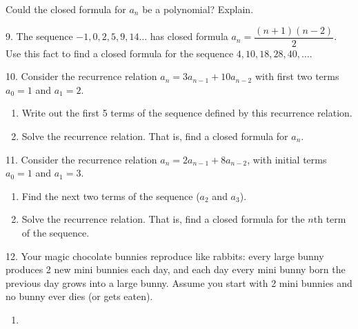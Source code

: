 \documentclass[10pt,]{book}
\theoremstyle{plain}
\theoremstyle{definition}
\theoremstyle{definition}
\theoremstyle{definition}
\numberwithin{equation}{chapter}
\begin{document}
\begin{exerciselist}
\begin{enumerate}[label=(\alph*)]
                Could the closed formula for \(a_n\) be a polynomial? Explain.
\end{enumerate}
\par\smallskip
\item[9.]\hypertarget{exercise-196}{}
            The sequence \(-1, 0, 2, 5, 9, 14\ldots\) has closed formula \(a_n = \dfrac{(n+1)(n-2)}{2}\). Use this fact to find a closed formula for the sequence \(4, 10, 18, 28, 40, \ldots\).
\par\smallskip
\item[10.]\hypertarget{exercise-197}{}
            Consider the recurrence relation \(a_n = 3a_{n-1} + 10 a_{n-2}\) with first two terms \(a_0 = 1\) and \(a_1 = 2\).
\leavevmode%
\begin{enumerate}[label=(\alph*)]
\item\hypertarget{li-989}{}
                Write out the first 5 terms of the sequence defined by this recurrence relation.
\item\hypertarget{li-990}{}
                Solve the recurrence relation. That is, find a closed formula for \(a_n\).
\end{enumerate}
\par\smallskip
\item[11.]\hypertarget{exercise-198}{}
            Consider the recurrence relation \(a_n = 2a_{n-1} + 8a_{n-2}\), with initial terms \(a_0 = 1\) and \(a_1= 3\).
\leavevmode%
\begin{enumerate}[label=(\alph*)]
\item\hypertarget{li-993}{}
                Find the next two terms of the sequence (\(a_2\) and \(a_3\)).
\item\hypertarget{li-994}{}
                Solve the recurrence relation. That is, find a closed formula for the \(n\)th term of the sequence.
\end{enumerate}
\par\smallskip
\item[12.]\hypertarget{exercise-199}{}
            Your magic chocolate bunnies reproduce like rabbits: every large bunny produces 2 new mini bunnies each day, and each day every mini bunny born the previous day grows into a large bunny. Assume you start with 2 mini bunnies and no bunny ever dies (or gets eaten).
\leavevmode%
\begin{enumerate}[label=(\alph*)]
\item\hypertarget{li-997}{}

\end{enumerate}
\end{exerciselist}
\end{document}
